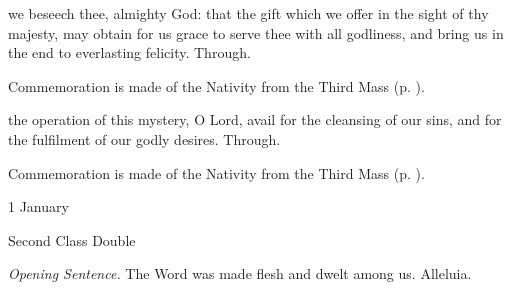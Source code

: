 \secret
{} we beseech thee, almighty God: that the gift which we offer in the sight of thy majesty, may obtain for us grace to serve thee with all godliness, and bring us in the end to everlasting felicity. Through.
\begin{rubric}
    Commemoration is made of the Nativity from the Third Mass (p. \pageref{NativityMassIIISecret}).
\end{rubric}
\postcommunion
{} the operation of this mystery, O Lord, avail for the cleansing of our sins, and for the fulfilment of our godly desires. Through.
\begin{rubric}
    Commemoration is made of the Nativity from the Third Mass (p. \pageref{NativityMassIIIPostcommunion}).
\end{rubric}


\begin{inhead}
{1 January}\par
{Second Class Double}
\end{inhead}
\par\noindent
\textit{Opening Sentence.} The Word was made flesh and dwelt among us. Alleluia.

\properantiphonfix

